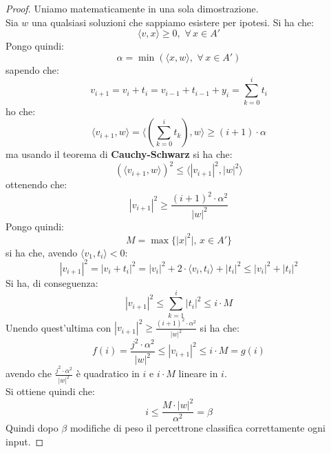 \documentclass[a4paper,12pt, oneside]{book}
\begin{document}
\begin{proof}
  Uniamo matematicamente in una sola dimostrazione.\\
  Sia $w$ una qualsiasi soluzioni che sappiamo esistere per ipotesi. Si ha che:
  \[\langle v, x\rangle\geq 0,\,\,\forall\,x\in A'\]
  Pongo quindi:
  \[\alpha=\min(\langle x,w\rangle,\,\,\forall\,x\in A')\]
  sapendo che:
  \[v_{i+1}=v_i+t_i=v_{i-1}+t_{i-1}+y_i=\sum_{k=0}^it_i\]
  ho che:
  \[\langle v_{i+1},w\rangle=\langle \left(\sum_{k=0}^i t_k \right),
    w\rangle\geq (i+1)\cdot\alpha\]
  ma usando il teorema di \textbf{Cauchy-Schwarz} si ha che:
  \[(\langle v_{i+1},w\rangle)^2\leq \langle |v_{i+1}|^2,|w|^2\rangle\]
  ottenendo che:
  \[|v_{i+1}|^2\geq \frac{(i+1)^2\cdot \alpha^2}{|w|^2}\]
  Pongo quindi:
  \[M=\max\{|x|^2|,\,x\in A'\}\]
  si ha che, avendo $\langle v_{1},t_i\rangle<0$:
  \[|v_{i+1}|^2=|v_i+t_i|^2=|v_i|^2+2\cdot\langle v_{i},t_i\rangle+|t_i|^2\leq
    |v_i|^2+|t_i|^2\]
  Si ha, di conseguenza:
  \[|v_{i+1}|^2\leq \sum_{k=1}^i |t_i|^2\leq i\cdot M\]
  Unendo quest'ultima con $|v_{i+1}|^2\geq \frac{(i+1)^2\cdot \alpha^2}{|w|^2}$
  si ha che:
  \[f(i)=\frac{j^2\cdot \alpha^2}{|w|^2}\leq |v_{i+1}|^2\leq i\cdot M=g(i)\]
  avendo che $\frac{j^2\cdot \alpha^2}{|w|^2}$ è quadratico in $i$ e $ i\cdot M$
  lineare in $i$.\\
  Si ottiene quindi che:
  \[i\leq\frac{M\cdot |w|^2}{\alpha^2}=\beta\]
  Quindi dopo $\beta$ modifiche di peso il percettrone classifica correttamente
  ogni input.
\end{proof}
\end{document}
